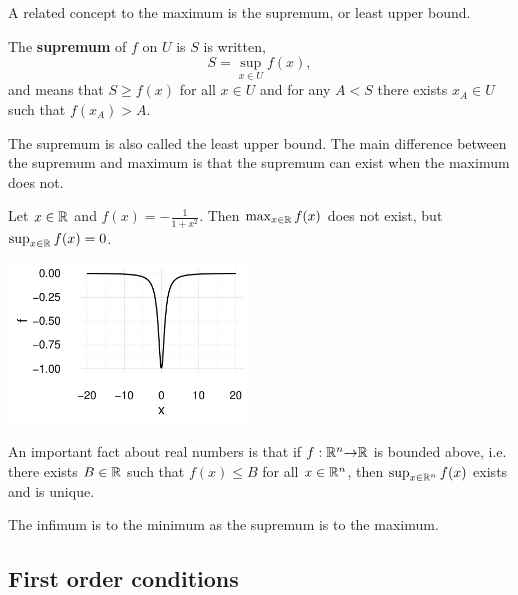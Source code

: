 A related concept to the maximum is the supremum, or least upper
bound.
\begin{definition}
  The \textbf{supremum} of $f$ on $U$ is $S$ is written, 
  \[ S = \sup_{x \in U} f(x), \]
  and means that $S \geq f(x)$ for all $x \in U$ and for any $A < S$
  there exists $x_A \in U$ such that $f(x_A) > A$. 
\end{definition}
The supremum is also called the least upper bound. The main difference
between the supremum and maximum is that the supremum can exist when
the maximum does not. 
\begin{example}
  \begin{multicols}{2}
    Let $x \in \mathbb{R}$ and $f(x) = -\frac{1}{1+x^2}$. Then $\max_{x \in \mathbb{R}}
    f(x)$ does not exist, but $\sup_{x \in \mathbb{R}} f(x) = 0$. 
    
    \columnbreak
    
    \includegraphics[width=0.48\textwidth]{ex12}

  \end{multicols}
  
\end{example}
An important fact about real numbers is that if $f:\mathbb{R}^n {\rightarrow} \mathbb{R}$ is
bounded above, i.e. there exists $B \in \mathbb{R}$ such that $f(x) \leq B$
for all $x \in \mathbb{R}^n$, then $\sup_{x \in \mathbb{R}^n} f(x)$ exists and is
unique. 

The infimum is to the minimum as the supremum is to the maximum.

\subsection{First order conditions}

